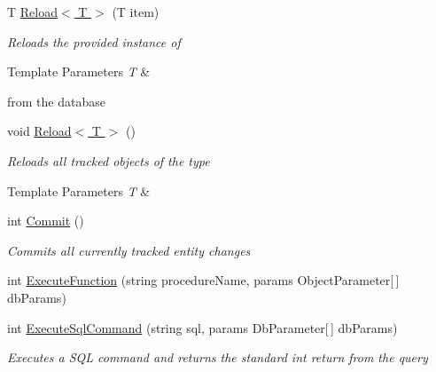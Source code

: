 \begin{DoxyCompactItemize}
T \hyperlink{class_framework_extension_1_1_entity_framework_1_1_tests_1_1_unit_tests_1_1_e_f_failure_context_a9ae371619fb677cd081d9540ee0da028}{Reload$<$ T $>$} (T item)
\begin{DoxyCompactList}\small\item\em Reloads the provided instance of 
\begin{DoxyTemplParams}{Template Parameters}
{\em T} & \\
\hline
\end{DoxyTemplParams}
from the database \end{DoxyCompactList}\item 
void \hyperlink{class_framework_extension_1_1_entity_framework_1_1_tests_1_1_unit_tests_1_1_e_f_failure_context_a8853cd1e280cdd8c1a46589239b1ba12}{Reload$<$ T $>$} ()
\begin{DoxyCompactList}\small\item\em Reloads all tracked objects of the type 
\begin{DoxyTemplParams}{Template Parameters}
{\em T} & \\
\hline
\end{DoxyTemplParams}
\end{DoxyCompactList}\item 
int \hyperlink{class_framework_extension_1_1_entity_framework_1_1_tests_1_1_unit_tests_1_1_e_f_failure_context_a470c419e85cd5e9f262219c00f7f50c6}{Commit} ()
\begin{DoxyCompactList}\small\item\em Commits all currently tracked entity changes \end{DoxyCompactList}\item 
int \hyperlink{class_framework_extension_1_1_entity_framework_1_1_tests_1_1_unit_tests_1_1_e_f_failure_context_aacb855d688d7782535b817ec31a470d3}{Execute\-Function} (string procedure\-Name, params Object\-Parameter\mbox{[}$\,$\mbox{]} db\-Params)
\begin{DoxyCompactList}\small\item\em \end{DoxyCompactList}\item 
int \hyperlink{class_framework_extension_1_1_entity_framework_1_1_tests_1_1_unit_tests_1_1_e_f_failure_context_a3a9251810905d4fe3a1193ba2d447a86}{Execute\-Sql\-Command} (string sql, params Db\-Parameter\mbox{[}$\,$\mbox{]} db\-Params)
\begin{DoxyCompactList}\small\item\em Executes a S\-Q\-L command and returns the standard int return from the query \end{DoxyCompactList}\item 

\end{DoxyCompactItemize}
